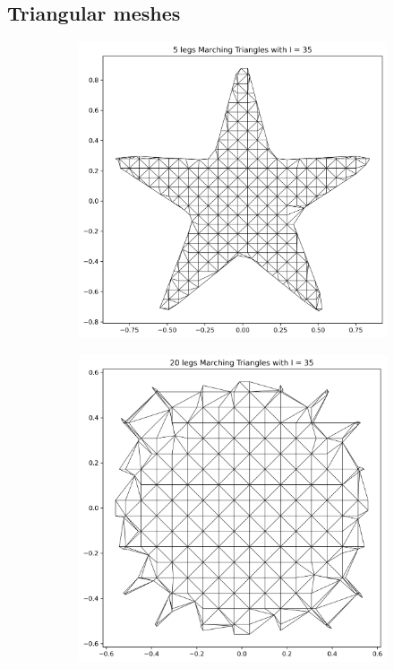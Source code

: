 \documentclass[acmtog]{acmart}
\begin{document}
\subsection*{Triangular meshes}

\begin{figure}[H]
  \centering
  \begin{subfigure}{0.22\textwidth}
    \centering
    \includegraphics[width=\textwidth]{Images/5 legs Marching Triangles with I = 35.png}
  \end{subfigure}\hfill
  \begin{subfigure}{0.22\textwidth}
    \centering
    \includegraphics[width=\textwidth]{Images/20 legs Marching Triangles with I = 35.png}
  \end{subfigure}


\end{figure}
\end{document}
